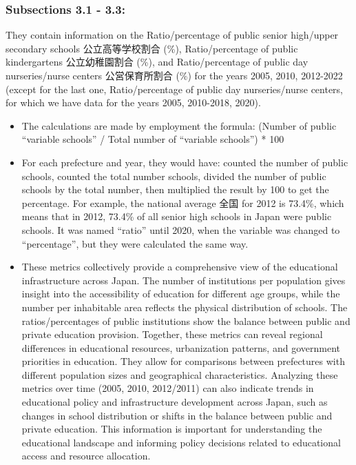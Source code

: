 \documentclass[
]{ltjarticle}
\begin{document}
\hypertarget{subsections-3.1---3.3}{%
\subsubsection{Subsections 3.1 - 3.3:}\label{subsections-3.1---3.3}}

They contain information on the Ratio/percentage of public senior
high/upper secondary schools 公立高等学校割合 (\%), Ratio/percentage of
public kindergartens 公立幼稚園割合 (\%), and Ratio/percentage of public
day nurseries/nurse centers 公営保育所割合 (\%) for the years 2005,
2010, 2012-2022 (except for the last one, Ratio/percentage of public day
nurseries/nurse centers, for which we have data for the years 2005,
2010-2018, 2020).

\begin{itemize}
\item
  The calculations are made by employment the formula: (Number of public
  ``variable schools'' / Total number of ``variable schools'') * 100
\item
  For each prefecture and year, they would have: counted the number of
  public schools, counted the total number schools, divided the number
  of public schools by the total number, then multiplied the result by
  100 to get the percentage. For example, the national average 全国 for
  2012 is 73.4\%, which means that in 2012, 73.4\% of all senior high
  schools in Japan were public schools. It was named ``ratio'' until
  2020, when the variable was changed to ``percentage'', but they were
  calculated the same way.
\item
  These metrics collectively provide a comprehensive view of the
  educational infrastructure across Japan. The number of institutions
  per population gives insight into the accessibility of education for
  different age groups, while the number per inhabitable area reflects
  the physical distribution of schools. The ratios/percentages of public
  institutions show the balance between public and private education
  provision. Together, these metrics can reveal regional differences in
  educational resources, urbanization patterns, and government
  priorities in education. They allow for comparisons between
  prefectures with different population sizes and geographical
  characteristics. Analyzing these metrics over time (2005, 2010,
  2012/2011) can also indicate trends in educational policy and
  infrastructure development across Japan, such as changes in school
  distribution or shifts in the balance between public and private
  education. This information is important for understanding the
  educational landscape and informing policy decisions related to
  educational access and resource allocation.
\end{itemize}
\end{document}
